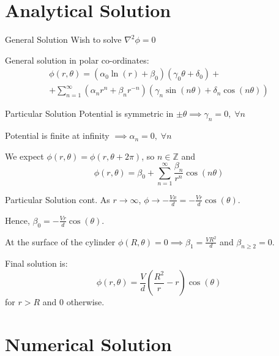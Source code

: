 \documentclass{beamer}
\newcommand{\be}{\begin{equation}}
\newcommand{\ee}{\end{equation}}
\begin{document}
\section{Analytical Solution}

\begin{frame}{General Solution}
Wish to solve $\nabla ^2 \phi = 0$

General solution in polar co-ordinates:
\begin{multline}
\phi(r, \theta) = (\alpha_0 \ln(r) + \beta_0)(\gamma_0\theta + \delta_0) + 
\\
                + \sum_{n=1}^{\infty}(\alpha_n r^n+\beta_n r^{-n})(\gamma_n \sin(n\theta) + \delta_n \cos(n\theta))
\end{multline}
\end{frame}

\begin{frame}{Particular Solution}
Potential is symmetric in $\pm\theta \implies \gamma_n=0, \; \forall n$

Potential is finite at infinity $\implies \alpha_n=0, \; \forall n$

We expect $\phi(r, \theta)=\phi(r, \theta +2\pi)$, so $n \in \mathbb{Z}$ and
\be
\phi(r, \theta) = \beta_0 + \sum_{n=1}^{\infty} \frac{\beta_n}{r^n} \cos(n\theta)
\ee
\end{frame}

\begin{frame}{Particular Solution cont.}
As $r \rightarrow \infty$, $\phi \rightarrow -\frac{Vx}{d}=-\frac{Vr}{d}\cos(\theta)$.

Hence, $\beta_0=-\frac{Vr}{d}\cos(\theta)$.

At the surface of the cylinder $\phi(R,\theta) = 0 \implies \beta_1=\frac{VR^2}{d}$ and
$\beta_{n \geq 2} = 0$.

Final solution is:
\be
\phi(r, \theta) = \frac{V}{d}(\frac{R^2}{r}-r)\cos(\theta)
\ee
for $r>R$ and $0$ otherwise.
\end{frame}


\section{Numerical Solution}

\begin{frame}
\titlepage
\end{frame}
\end{document}
